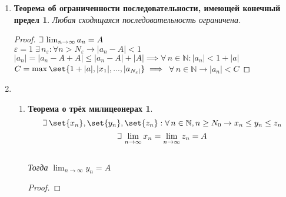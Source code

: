 \documentclass{article}
\theoremstyle{plain}
\def\letus{%
    \mathord{\setbox0=\hbox{$\exists$}%
             \hbox{\kern 0.125\wd0%
                   \vbox to \ht0{%
                      \hrule width 0.75\wd0%
                      \vfill%
                      \hrule width 0.75\wd0}%
                   \vrule height \ht0%
                   \kern 0.125\wd0}%
           }%
}
\begin{document}
\begin{enumerate}
\begin{enumerate}
\begin{proof}
         
        $\letus{}\, A, B, A < B$ - пределы последовательности $\set{{a_{n}}}$. Тогда по определению:
        $$\forall\,\varepsilon > 0\,\, \exists\,N_{\varepsilon_{1}}\in \mathbb{N}: \forall\, n \in \mathbb{N}, n > N_{\varepsilon_{1}} \rightarrow |a_{n} - A| < \varepsilon_{1}$$
        $$\forall\,\varepsilon_{2} > 0\,\, \exists\,N_{\varepsilon_{2}}\in \mathbb{N}: \forall\, n \in \mathbb{N}, n > N_{\varepsilon_{2}} \rightarrow |a_{n} - B| < \varepsilon_{2}$$
        Пусть $\varepsilon = \varepsilon_{1} = \varepsilon_{2} = \frac{B - A}{3}.$ Тогда $\forall\, n > \max{N_{\varepsilon_{1}}, N_{\varepsilon_{2}}}\rightarrow U_{\varepsilon}(B) \rotatebox{180}{$\in$} a_{n} \in U_{\varepsilon}(A),$ но по построению $U_{\varepsilon}(A)\, \cap\, U_{\varepsilon}(B) = \emptyset $. Противоречие.
       \end{proof}
        \end{enumerate}
        \item \newtheorem*{theorem6*}{Теорема об ограниченности последовательности, имеющей конечный предел}
        \begin{theorem6*}
        Любая сходящаяся последовательность ограничена.
        \end{theorem6*}
        \begin{proof}
        $\letus{}\,\lim_{n \to \infty}{a_{n}} = A$\\
        $\varepsilon = 1\;\exists\, n_{\varepsilon}: \forall n > N_{\varepsilon} \rightarrow |a_n - A| < 1$\\
        $|a_n| = |a_n - A + A| \le |a_n - A| + |A| \implies \forall\, n \in \mathbb{N}: |a_n| < 1 + |a|$\\
        $C = \max{\set{1 + |a|, |x_1|, ... , |a_{N_\varepsilon|}}}\implies$
        $\forall\,n\in\mathbb{N}\rightarrow |a_n| < C$
        \end{proof}
        \item \begin{enumerate}
            \item \newtheorem*{theorem7*}{Теорема о трёх милицеонерах}
            \begin{theorem7*}
            $$\letus{}\, \set{{x_n}}, \set{{y_n}}, \set{{z_n}}: \forall\, n \in \mathbb{N}, n \ge N_0 \rightarrow x_n \le y_n \le z_n$$
            $$\letus{}\, \lim_{n \to \infty}{x_n} = \lim_{n \to \infty}{z_n} = A$$\\
            Тогда $\lim_{n \to \infty}{y_n} = A$
            \end{theorem7*}
            \begin{proof}

\end{proof}
\end{enumerate}
\end{enumerate}
\end{document}
